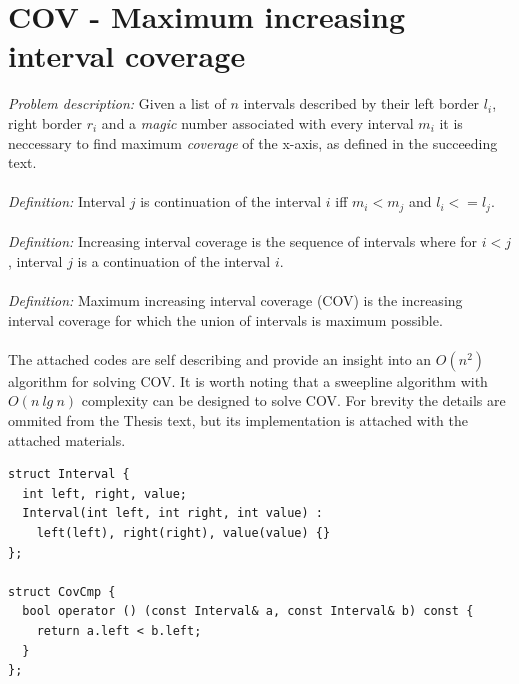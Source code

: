 \documentclass[times, utf8, diplomski]{fer}
\begin{document}
\pagebreak

\section{COV - Maximum increasing interval coverage}

\emph{Problem description: } Given a list of $n$ intervals described by their left border $l_i$, right border $r_i$ and a \emph{magic} number associated with every interval $m_i$ it is neccessary to find maximum \emph{coverage} of the x-axis, as defined in the succeeding text.\\
\\
\emph{Definition: } Interval $j$ is continuation of the interval $i$ iff $m_i<m_j$ and $l_i <= l_j$.\\
\\
\emph{Definition: } Increasing interval coverage is the sequence of intervals where for $i<j$, interval $j$ is a continuation of the interval $i$.\\
\\
\emph{Definition: } Maximum increasing interval coverage (COV) is the increasing interval coverage for which the union of intervals is maximum possible.\\
\\
The attached codes are self describing and provide an insight into an $O(n^2)$ algorithm for solving COV. It is worth noting that a sweepline algorithm with $O(n\ lg\ n)$ complexity can be designed to solve COV. For brevity the details are ommited from the Thesis text, but its implementation is attached with the attached materials.\\

\begin{algorithm}[H]
\begin{lstlisting}
struct Interval {
  int left, right, value;
  Interval(int left, int right, int value) :
    left(left), right(right), value(value) {}
};

struct CovCmp {
  bool operator () (const Interval& a, const Interval& b) const {
    return a.left < b.left;
  }
};
\end{lstlisting}
\end{algorithm}
\end{document}
